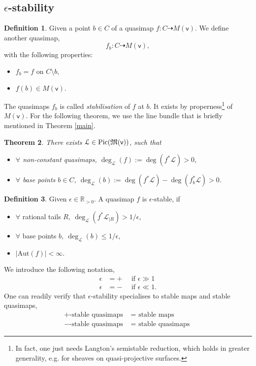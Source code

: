 \documentclass[11pt, reqno]{amsart}
\theoremstyle{plain}
\newtheorem{thm}{Theorem}[section]
\theoremstyle{definition}
\newtheorem{defn}[thm]{Definition}
\theoremstyle{remark}
\newcommand{\BR}{{\mathbb{R}}}
\newcommand{\CL}{{\mathcal L}}
\newcommand{\FM}{{\mathfrak{M}}}
\newcommand{\vsf}{{\mathsf{v}}}
\newcommand{\Pic}{\mathop{\rm Pic}\nolimits}
\newcommand{\Aut}{\mathrm{Aut}}
\begin{document}
\subsection{$\epsilon$-stability}
\begin{defn}
	Given a point $b \in C$ of a quasimap $f\colon C \dasharrow M(\vsf)$. We define another quasimap,
	\[f_b \colon C \dasharrow M(\vsf),\]
	with the following properties:
	\begin{itemize}
		\item $f_b=f$ on $C \setminus b$, 
		\item $f(b) \in M(\vsf)$. 
		\end{itemize}
The quasimaps $f_b$ is called \textit{stabilisation} of $f$ at $b$. It exists by properness\footnote{In fact, one just needs Langton's semistable reduction, which holds in greater generality, e.g. for sheaves on quasi-projective surfaces.} of $M(\vsf)$. For the following theorem, we use the line bundle that is briefly mentioned in Theorem \ref{main}. 

	\end{defn}
\begin{thm} There exists $\CL \in \Pic(\FM(\vsf))$, such that 
	\begin{itemize}
	\item $\forall$ non-constant quasimaps, $\deg_\CL(f):= \deg(f^*\CL)>0$,
	\item $\forall$ base points $b\in C$, $\deg_\CL(b):=\deg(f^*\CL)-\deg(f_b^*\CL)>0$. 
	\end{itemize}
	\end{thm}
\begin{defn} Given $\epsilon \in \BR_{>0}$. A quasimap $f$ is $\epsilon$-stable, if 
	\begin{itemize}
		\item $\forall$ rational tails $R, \  \deg_\CL(f^*\CL_{|R})>1/\epsilon$,
		\item $\forall$ base points $b, \ \deg_\CL(b)\leq 1/\epsilon$,
		\item $|\Aut(f)|<\infty$. 
		\end{itemize}
	\end{defn}
We introduce the following notation, 
\begin{align*}
\epsilon&=+ \quad \text{ if }\epsilon\gg 1 \\
\epsilon&=- \quad \text{ if } \epsilon\ll 1. 
\end{align*}
One can readily verify that $\epsilon$-stability specialises to stable maps and stable quasimaps, 
\begin{align*}
	+\text{-stable quasimaps } &= \text{ stable maps } \\
	- \text{-stable quasimaps } &= \text{ stable quasimaps }
	\end{align*}
\end{document}

